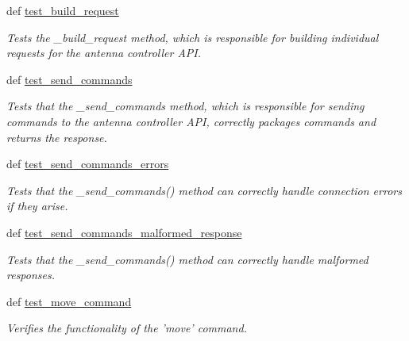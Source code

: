 \begin{DoxyCompactItemize}
\item 
def \hyperlink{classhwm_1_1hardware_1_1devices_1_1drivers_1_1mxl__antenna__controller_1_1tests_1_1test__mxl__anf1b82778ca0869b41ace53be3d0454a2_a687e38b0d47ab2e5ba341511b58d51fd}{test\-\_\-build\-\_\-request}
\begin{DoxyCompactList}\small\item\em Tests the \-\_\-build\-\_\-request method, which is responsible for building individual requests for the antenna controller A\-P\-I. \end{DoxyCompactList}\item 
def \hyperlink{classhwm_1_1hardware_1_1devices_1_1drivers_1_1mxl__antenna__controller_1_1tests_1_1test__mxl__anf1b82778ca0869b41ace53be3d0454a2_a7d7cda12881df8daa6d964747576ce31}{test\-\_\-send\-\_\-commands}
\begin{DoxyCompactList}\small\item\em Tests that the \-\_\-send\-\_\-commands method, which is responsible for sending commands to the antenna controller A\-P\-I, correctly packages commands and returns the response. \end{DoxyCompactList}\item 
def \hyperlink{classhwm_1_1hardware_1_1devices_1_1drivers_1_1mxl__antenna__controller_1_1tests_1_1test__mxl__anf1b82778ca0869b41ace53be3d0454a2_a09130cc432b8abd59893b082760e2cca}{test\-\_\-send\-\_\-commands\-\_\-errors}
\begin{DoxyCompactList}\small\item\em Tests that the \-\_\-send\-\_\-commands() method can correctly handle connection errors if they arise. \end{DoxyCompactList}\item 
def \hyperlink{classhwm_1_1hardware_1_1devices_1_1drivers_1_1mxl__antenna__controller_1_1tests_1_1test__mxl__anf1b82778ca0869b41ace53be3d0454a2_ae01fd5b65ef00dc7ab874c0ec675b6cf}{test\-\_\-send\-\_\-commands\-\_\-malformed\-\_\-response}
\begin{DoxyCompactList}\small\item\em Tests that the \-\_\-send\-\_\-commands() method can correctly handle malformed responses. \end{DoxyCompactList}\item 
def \hyperlink{classhwm_1_1hardware_1_1devices_1_1drivers_1_1mxl__antenna__controller_1_1tests_1_1test__mxl__anf1b82778ca0869b41ace53be3d0454a2_aff2516189d4a82cde63bce9663819a46}{test\-\_\-move\-\_\-command}
\begin{DoxyCompactList}\small\item\em Verifies the functionality of the 'move' command. \end{DoxyCompactList}\item 

\end{DoxyCompactItemize}
